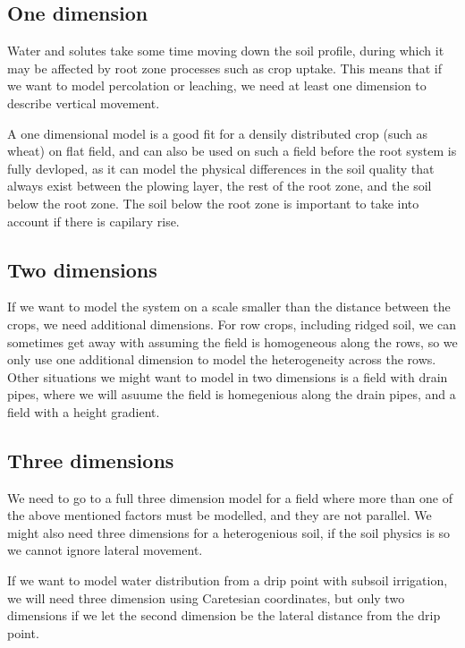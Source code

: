 \documentclass[a4paper,11pt,twoside]{article}
\begin{document}
\subsection{One dimension}

Water and solutes take some time moving down the soil profile, during
which it may be affected by root zone processes such as crop uptake.
This means that if we want to model percolation or leaching, we need
at least one dimension to describe vertical movement.

A one dimensional model is a good fit for a densily distributed crop
(such as wheat) on flat field, and can also be used on such a field
before the root system is fully devloped, as it can model the physical
differences in the soil quality that always exist between the plowing
layer, the rest of the root zone, and the soil below the root zone.
The soil below the root zone is important to take into account if
there is capilary rise.

\subsection{Two dimensions}

If we want to model the system on a scale smaller than the distance
between the crops, we need additional dimensions.  For row crops,
including ridged soil, we can sometimes get away with assuming the
field is homogeneous along the rows, so we only use one additional
dimension to model the heterogeneity across the rows.  Other
situations we might want to model in two dimensions is a field with
drain pipes, where we will asuume the field is homegenious along the
drain pipes, and a field with a height gradient.

\subsection{Three dimensions}

We need to go to a full three dimension model for a field where more
than one of the above mentioned factors must be modelled, and they are
not parallel.  We might also need three dimensions for a heterogenious
soil, if the soil physics is so we cannot ignore lateral movement.  

If we want to model water distribution from a drip point with subsoil
irrigation, we will need three dimension using Caretesian coordinates,
but only two dimensions if we let the second dimension be the
lateral distance from the drip point.
\end{document}
